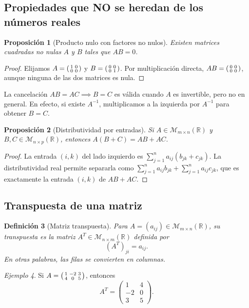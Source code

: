\documentclass[12pt]{article}
\newtheorem{definicion}{Definición}[section]
\newtheorem{proposicion}[definicion]{Proposición}
\theoremstyle{remark}
\newtheorem{ejemplo}[definicion]{Ejemplo}
\newcommand{\R}{\mathbb{R}}
\newcommand{\Mat}[2]{\mathcal{M}_{#1\times #2}}
\begin{document}
\subsection{Propiedades que NO se heredan de los números reales}
\begin{proposicion}[Producto nulo con factores no nulos]
Existen matrices cuadradas no nulas $A$ y $B$ tales que $AB=0$.
\end{proposicion}
\begin{proof}
Elijamos $A=\begin{psmallmatrix}1&0\\0&0\end{psmallmatrix}$ y $B=\begin{psmallmatrix}0&0\\0&1\end{psmallmatrix}$. Por multiplicación directa, $AB=\begin{psmallmatrix}0&0\\0&0\end{psmallmatrix}$, aunque ninguna de las dos matrices es nula.
\end{proof}
La cancelación $AB=AC\implies B=C$ es válida cuando $A$ es invertible, pero no en general. En efecto, si existe $A^{-1}$, multiplicamos a la izquierda por $A^{-1}$ para obtener $B=C$.
\begin{proposicion}[Distributividad por entradas]
Si $A\in\Mat{m}{n}(\R)$ y $B,C\in\Mat{n}{p}(\R)$, entonces $A(B+C)=AB+AC$.
\end{proposicion}
\begin{proof}
La entrada $(i,k)$ del lado izquierdo es $\sum_{j=1}^{n}a_{ij}(b_{jk}+c_{jk})$. La distributividad real permite separarla como $\sum_{j=1}^{n}a_{ij}b_{jk}+\sum_{j=1}^{n}a_{ij}c_{jk}$, que es exactamente la entrada $(i,k)$ de $AB+AC$.
\end{proof}


\subsection{Transpuesta de una matriz}
\begin{definicion}[Matriz transpuesta]
Para $A=(a_{ij})\in\Mat{m}{n}(\R)$, su \emph{transpuesta} es la matriz $A^T\in\Mat{n}{m}(\R)$ definida por
\[
(A^T)_{ji}=a_{ij}.
\]
En otras palabras, las filas se convierten en columnas.
\end{definicion}
\begin{ejemplo}
Si $A=\begin{psmallmatrix}1&-2&3\\4&0&5\end{psmallmatrix}$, entonces
\[
A^T=\begin{pmatrix}1&4\\-2&0\\3&5\end{pmatrix}.
\]
\end{ejemplo}
\end{document}
